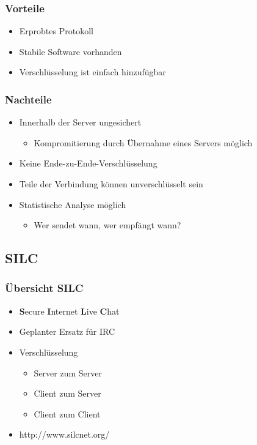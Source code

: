 \documentclass{beamer}
\begin{document}
\frame
{
  \frametitle{Vorteile}

  \begin{itemize}
  \item Erprobtes Protokoll
  \pause
  \item Stabile Software vorhanden
  \pause
  \item Verschl\"usselung ist einfach hinzuf\"ugbar
  \end{itemize}
}

\frame
{
  \frametitle{Nachteile}

  \begin{itemize}
  \item Innerhalb der Server ungesichert
  \pause
  \begin{itemize}
  \item Kompromitierung durch \"Ubernahme eines Servers m\"oglich
  \pause
  \end{itemize}
  \item Keine Ende-zu-Ende-Verschl\"usselung
  \pause
  \item Teile der Verbindung k\"onnen unverschl\"usselt sein
  \pause
  \item Statistische Analyse m\"oglich
  \pause
  \begin{itemize}
  \item Wer sendet wann, wer empf\"angt wann?
  \end{itemize}
  \end{itemize}
}

\subsection{SILC}
\frame
{
  \frametitle{\"Ubersicht SILC}

  \begin{itemize}
  \item \textbf{S}ecure \textbf{I}nternet \textbf{L}ive \textbf{C}hat
  \pause
  \item Geplanter Ersatz f\"ur IRC
  \pause
  \item Verschl\"usselung
  \pause
  \begin{itemize}
  \item Server zum Server
  \pause
  \item Client zum Server
  \pause
  \item Client zum Client
  \pause
  \end{itemize}
  \item http://www.silcnet.org/
  \end{itemize}
}
\end{document}
